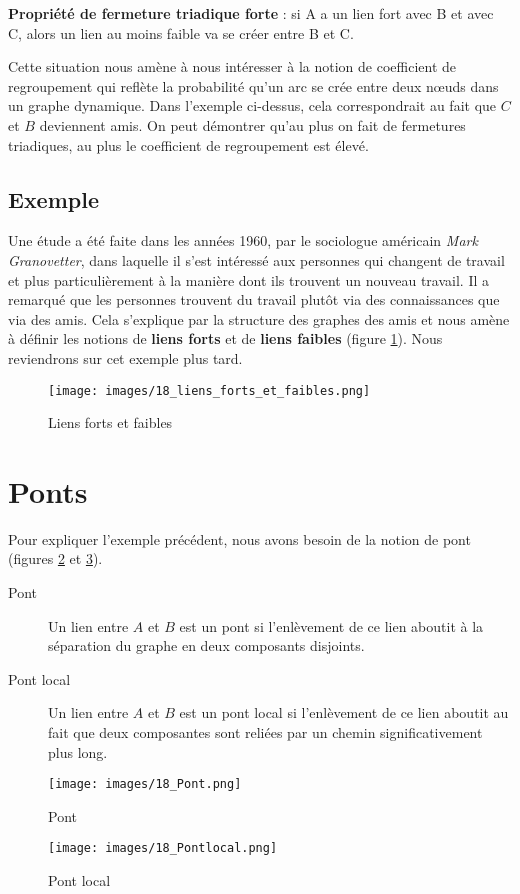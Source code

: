 \textbf{Propriété de fermeture triadique forte} : si A a un lien fort avec B et avec C, alors un lien au moins faible va se créer entre B et C.

Cette situation nous amène à nous intéresser à la notion de coefficient de regroupement qui reflète la probabilité qu'un arc se crée entre deux n\oe uds dans un graphe dynamique. 
Dans l'exemple ci-dessus, cela correspondrait au fait que $C$ et $B$ deviennent amis. On peut démontrer qu'au plus on fait de fermetures triadiques, au plus le coefficient de regroupement est élevé.

\subsection*{Exemple}
Une étude a été faite dans les années 1960, par le sociologue américain \textit{Mark Granovetter}, dans laquelle il s'est intéressé aux personnes qui changent de travail et plus particulièrement à la manière dont ils trouvent un nouveau travail. Il a remarqué que les personnes trouvent du travail plutôt via des connaissances que via des amis. Cela s'explique par la structure des graphes des amis et nous amène à définir les notions de \textbf{liens forts} et de \textbf{liens faibles} (figure \ref{liens_forts_et_faibles}). Nous reviendrons sur cet exemple plus tard.

	\begin{figure}[!h]
	\center
	\texttt{[image: images/18\_liens\_forts\_et\_faibles.png]}
	\caption{\label{liens_forts_et_faibles} Liens forts et faibles}
	\end{figure}

    
\section{Ponts}
Pour expliquer l'exemple précédent, nous avons besoin de la notion de pont (figures \ref{Pont} et \ref{Pontlocal}).
	\begin{description}
	\item[Pont] Un lien entre $A$ et $B$ est un pont si l'enlèvement de ce lien aboutit à la séparation du graphe en deux composants disjoints.
    \item[Pont local] Un lien entre $A$ et $B$ est un pont local si l'enlèvement de ce lien aboutit au fait que deux composantes sont reliées par un chemin significativement plus long.
    \end{description}
    
    \begin{figure}[!ht]
    \center
    \texttt{[image: images/18\_Pont.png]}
    \caption{\label{Pont} Pont}
    \end{figure}
    
    \begin{figure}[!ht]
    \center
    \texttt{[image: images/18\_Pontlocal.png]}
    \caption{\label{Pontlocal} Pont local}
    \end{figure}
